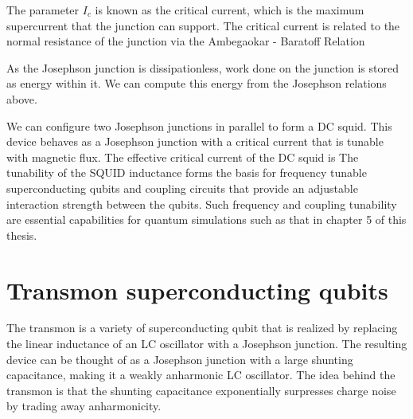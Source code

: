 
The parameter $I_c$ is known as the critical current, which is the maximum supercurrent that the junction can support.
The critical current is related to the normal resistance of the junction via the
Ambegaokar - Baratoff Relation \cite{Ambegaokar1963}

As the Josephson junction is dissipationless, work done on the junction is stored as energy within it.
We can compute this energy from the Josephson relations above.

We can configure two Josephson junctions in parallel to form a DC squid.
This device behaves as a Josephson junction with a critical current that is tunable with magnetic flux.
The effective critical current of the DC squid is \cite{vanDuzer1999}
The tunability of the SQUID inductance forms the basis for frequency tunable superconducting qubits
and coupling circuits that provide an adjustable interaction strength between the qubits.
Such frequency and coupling tunability are essential capabilities for quantum simulations such as that in chapter 5 of this thesis.

\section{Transmon superconducting qubits}

The transmon is a variety of superconducting qubit that is realized by replacing the linear inductance of an LC oscillator with a Josephson junction.
The resulting device can be thought of as a Josephson junction with a large shunting capacitance, making it a weakly anharmonic LC oscillator.
The idea behind the transmon is that the shunting capacitance exponentially surpresses charge noise by trading away anharmonicity\cite{Koch2007}.

